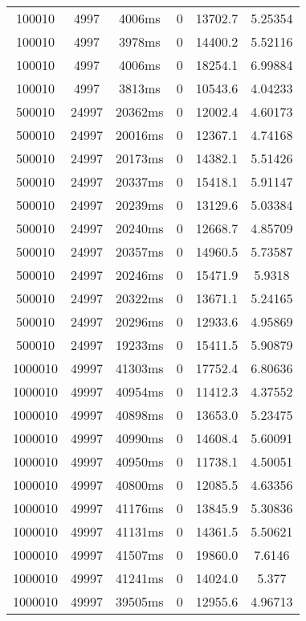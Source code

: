 \documentclass[./main.tex]{subfiles}
\begin{document}
\begin{table}
\begin{tabular}{ c | c | c | c | c | c }
        \rowcolor{lightgray} 100010 & 4997 & 4006ms & 0 & 13702.7 & 5.25354 \\
        100010 & 4997 & 3978ms & 0 & 14400.2 & 5.52116 \\
        100010 & 4997 & 4006ms & 0 & 18254.1 & 6.99884 \\
        100010 & 4997 & 3813ms & 0 & 10543.6 & 4.04233 \\
        \hline
        500010 & 24997 & 20362ms & 0 & 12002.4 & 4.60173 \\
        500010 & 24997 & 20016ms & 0 & 12367.1 & 4.74168 \\
        500010 & 24997 & 20173ms & 0 & 14382.1 & 5.51426 \\
        500010 & 24997 & 20337ms & 0 & 15418.1 & 5.91147 \\
        500010 & 24997 & 20239ms & 0 & 13129.6 & 5.03384 \\
        500010 & 24997 & 20240ms & 0 & 12668.7 & 4.85709 \\
        500010 & 24997 & 20357ms & 0 & 14960.5 & 5.73587 \\
        500010 & 24997 & 20246ms & 0 & 15471.9 & 5.9318 \\
        \rowcolor{lightgray} 500010 & 24997 & 20322ms & 0 & 13671.1 & 5.24165 \\
        500010 & 24997 & 20296ms & 0 & 12933.6 & 4.95869 \\
        500010 & 24997 & 19233ms & 0 & 15411.5 & 5.90879 \\
        \hline
        1000010 & 49997 & 41303ms & 0 & 17752.4 & 6.80636 \\
        1000010 & 49997 & 40954ms & 0 & 11412.3 & 4.37552 \\
        1000010 & 49997 & 40898ms & 0 & 13653.0 & 5.23475 \\
        1000010 & 49997 & 40990ms & 0 & 14608.4 & 5.60091 \\
        1000010 & 49997 & 40950ms & 0 & 11738.1 & 4.50051 \\
        1000010 & 49997 & 40800ms & 0 & 12085.5 & 4.63356 \\
        \rowcolor{lightgray} 1000010 & 49997 & 41176ms & 0 & 13845.9 & 5.30836 \\
        1000010 & 49997 & 41131ms & 0 & 14361.5 & 5.50621 \\
        1000010 & 49997 & 41507ms & 0 & 19860.0 & 7.6146 \\
        1000010 & 49997 & 41241ms & 0 & 14024.0 & 5.377 \\
        1000010 & 49997 & 39505ms & 0 & 12955.6 & 4.96713 \\

\end{tabular}
\end{table}
\end{document}
